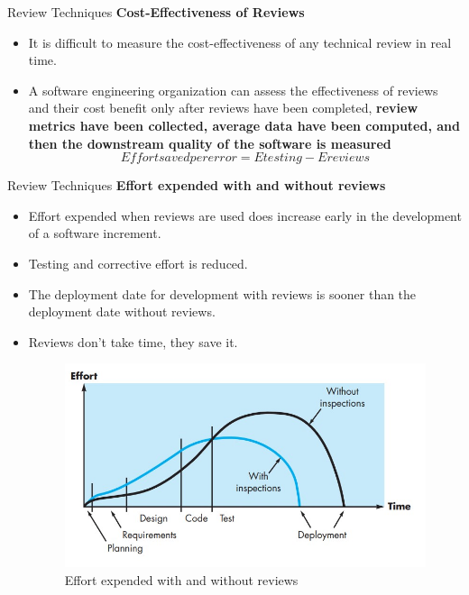 \documentclass{beamer}
\begin{document}
\begin{frame}{Review Techniques}
	\textbf{Cost-Effectiveness of Reviews}
	\begin{itemize}
		\item It is difficult to measure the cost-effectiveness of any technical review in real time.
		\item A software engineering organization can assess the effectiveness of reviews and their cost benefit only after reviews have been completed, \textbf{review metrics have been collected, average data have been computed, and   then the downstream quality of the software is measured}
		$$ Effort saved per error = Etesting - Ereviews $$
	\end{itemize}
\end{frame}
\begin{frame}{Review Techniques}
	\textbf{Effort expended with and without reviews}
	\begin{itemize}
		\item Effort expended when reviews are used does increase early in the development of a software increment. 
		\item Testing and corrective effort is reduced. 
		\item The deployment date for development with reviews is sooner than the deployment date without reviews. 
		\item Reviews don’t take time, they save it. 
			\begin{figure}
			\includegraphics[scale=.4]{img/m3_19}
			\caption{Effort expended with and without 	reviews}
		\end{figure}
	\end{itemize}
\end{frame}
\end{document}
